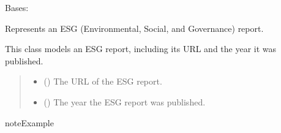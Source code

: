 \documentclass[letterpaper,10pt,english]{sphinxmanual}
\begin{document}
\begin{fulllineitems}
\label{\detokenize{src.data_models:src.data_models.company.ESGReport}}
\pysigstartsignatures
\pysiglinewithargsret
{}
{\sphinxparamcomma {}\sphinxparamcomma {}}
{}
\pysigstopsignatures
\sphinxAtStartPar
Bases: 

\sphinxAtStartPar
Represents an ESG (Environmental, Social, and Governance) report.

\sphinxAtStartPar
This class models an ESG report, including its URL and the year it was published.
\begin{quote}\begin{description}
\begin{itemize}
\item {} 
\sphinxAtStartPar
{} (\sphinxstyleliteralemphasis{\sphinxupquote{{[}}}\sphinxstyleliteralemphasis{\sphinxupquote{{]}}}) \textendash{} The URL of the ESG report.

\item {} 
\sphinxAtStartPar
{} (\sphinxstyleliteralemphasis{\sphinxupquote{{[}}}\sphinxstyleliteralemphasis{\sphinxupquote{{]}}}) \textendash{} The year the ESG report was published.

\end{itemize}

\end{description}\end{quote}

\begin{sphinxadmonition}{note}{Example}


\end{sphinxadmonition}
\end{fulllineitems}
\end{document}
